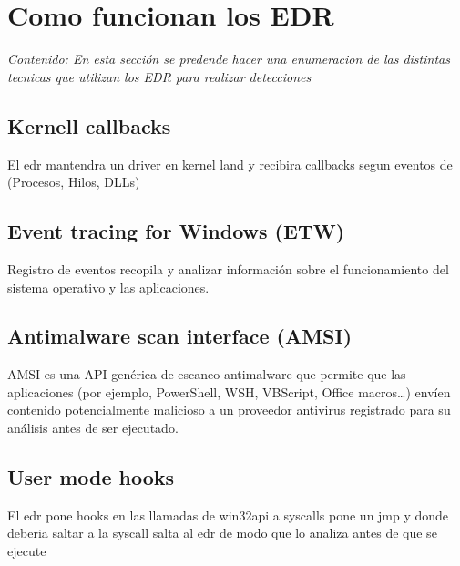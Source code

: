 \chapter{Como funcionan los EDR}

\textit{Contenido: En esta sección se predende hacer una enumeracion de las 
distintas tecnicas que utilizan los EDR para realizar detecciones}
\vspace{1em}

\section{Kernell callbacks}

El edr mantendra un driver en kernel land y recibira callbacks segun eventos 
de (Procesos, Hilos, DLLs)

\section{Event tracing for Windows (ETW)}

Registro de eventos recopila y analizar información sobre el funcionamiento 
del sistema operativo y las aplicaciones.

\section{Antimalware scan interface (AMSI)}

AMSI es una API genérica de escaneo antimalware que permite que las aplicaciones
(por ejemplo, PowerShell, WSH, VBScript, Office macros…) envíen contenido 
potencialmente malicioso a un proveedor antivirus registrado para su análisis 
antes de ser ejecutado.

\section{User mode hooks}

El edr pone hooks en las llamadas de win32api a syscalls
pone un jmp y donde deberia saltar a la syscall salta al edr de modo que lo 
analiza antes de que se ejecute